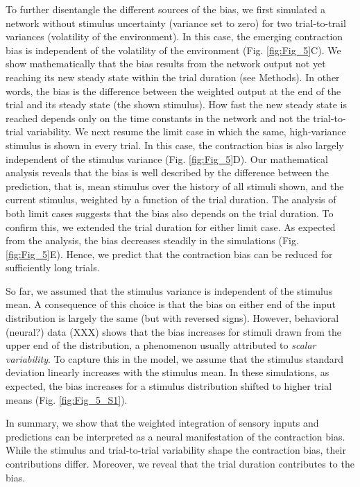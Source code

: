 \documentclass[10pt,a4paper,draft]{article}
\begin{document}
To further disentangle the different sources of the bias, we first simulated a network without stimulus uncertainty (variance set to zero) for two trial-to-trail variances (volatility of the environment). In this case, the emerging contraction bias is independent of the volatility of the environment (Fig. \ref{fig:Fig_5}C). We show mathematically that the bias results from the network output not yet reaching its new steady state within the trial duration (see Methods). In other words, the bias is the difference between the weighted output at the end of the trial and its steady state (the shown stimulus). How fast the new steady state is reached depends only on the time constants in the network and not the trial-to-trial variability. We next resume the limit case in which the same, high-variance stimulus is shown in every trial. In this case, the contraction bias is also largely independent of the stimulus variance (Fig. \ref{fig:Fig_5}D). Our mathematical analysis reveals that the bias is well described by the difference between the prediction, that is, mean stimulus over the history of all stimuli shown, and the current stimulus, weighted by a function of the trial duration. The analysis of both limit cases suggests that the bias also depends on the trial duration. To confirm this, we extended the trial duration for either limit case. As expected from the analysis, the bias decreases steadily in the simulations (Fig. \ref{fig:Fig_5}E). Hence, we predict that the contraction bias can be reduced for sufficiently long trials. 

So far, we assumed that the stimulus variance is independent of the stimulus mean. A consequence of this choice is that the bias on either end of the input distribution is largely the same (but with reversed signs). However, behavioral (neural?) data (XXX) shows that the bias increases for stimuli drawn from the upper end of the distribution, a phenomenon usually attributed to \textit{scalar variability}. To capture this in the model, we assume that the stimulus standard deviation linearly increases with the stimulus mean. In these simulations, as expected, the bias increases for a stimulus distribution shifted to higher trial means (Fig. \ref{fig:Fig_5_S1}).

In summary, we show that the weighted integration of sensory inputs and predictions can be interpreted as a neural manifestation of the contraction bias. While the stimulus and trial-to-trial variability shape the contraction bias, their contributions differ. Moreover, we reveal that the trial duration contributes to the bias.
\end{document}
